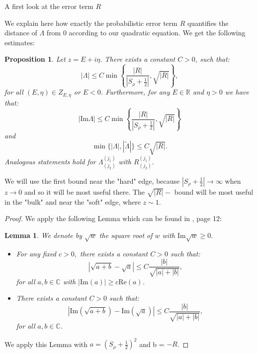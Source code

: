 \documentclass[11pt, a4paper, oneside]{book}
\numberwithin{equation}{chapter}
\newcommand{\beq}{\begin{equation}}
\newcommand{\eeq}{\end{equation}}
\newtheorem{prop}[thm]{Proposition}
\newtheorem{lem}[thm]{Lemma}
\begin{document}
\begin{section}{A first look at the error term \texorpdfstring{$R$}{R} }

We explain here how exactly the probabilistic error term $R$ quantifies the distance of $\Lambda$ from $0$ according to our quadratic equation. We get the following estimates:

\begin{prop} \label{b-R}
Let $z = E + i\eta$. There exists a constant $C>0$, such that:
%
\begin{equation} \label{e:Lambdabound}
|\Lambda| \leq C \min \left \{ \frac{|R|}{|S_{\rho} + \frac{1}{2}|} , \sqrt{|R|} \right \} ,
\end{equation}
%
for all $(E, \eta) \in Z_{E, \eta} $ or $E<0$. Furthermore, for any $E\in \mathbb{R}$ and $\eta > 0$ we have that:
%
\begin{equation}\label{e:imLambdabound}
|\mathrm{Im} \Lambda| \leq C\min \left\{ \frac{|R|}{|S_{\rho} + \frac{1}{2}|} , \sqrt{|R|} \right \}
\end{equation}
and
%
\begin{equation}\label{e:twosolutionsbound}
\min\{|\Lambda|, |\tilde{\Lambda}|\} \leq C\sqrt{|R|}.
\end{equation}
%
Analogous statements hold for $\Lambda_{(j_2)}^{(j_1)}$ with $R_{(j_2)}^{(j_1)}$.
\end{prop}

\pagebreak

We will use the first bound near the "hard" edge, because $|S_{\rho} + \frac{1}{2}| \to \infty$ when $z \to 0$ and so it will be most useful there. The $\sqrt{|R|}-$ bound will be most useful in the "bulk" and near the "soft" edge, where $z \sim 1.$
%
%
\begin{proof}
We apply the following Lemma which can be found in \cite{cacciapuoti2015bounds}, page 12:
%
\begin{lem}  \label{sqrt} We denote by $\sqrt{w}$ the square root of $w$ with $\mathrm{Im} \sqrt{w} \geq 0. $
    \begin{itemize}
        \item For any fixed $c>0,$ there exists a constant $C>0$ such that:
        \beq \label{sqrt1}  
            \left |\sqrt{a+b} - \sqrt{a} \right | \leq C \frac{|b|}{\sqrt{|a|+|b|}},
        \eeq
        for all $a,b \in \mathbb{C}$ with $|\mathrm{Im} (a)| \geq c \mathrm{Re} (a)$.
        \item There exists a constant $C>0$ such that:
        \beq \label{sqrt2}
            \left |\mathrm{Im} \left ( \sqrt{a+b} \right ) - \mathrm{Im} ( \sqrt{a} )  \right | \leq C \frac{|b|}{\sqrt{|a|+|b|}},
        \eeq
        for all $a,b \in \mathbb{C}$.
    \end{itemize}
\end{lem}
%
We apply this Lemma with $a= (S_{\rho} + \frac{1}{2})^2$ and b = $ - R $. 


\end{proof}
\end{section}
\end{document}
